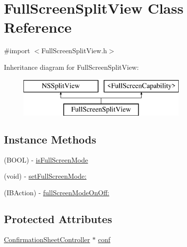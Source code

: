 \hypertarget{interface_full_screen_split_view}{\section{Full\-Screen\-Split\-View Class Reference}
\label{interface_full_screen_split_view}
}


{\ttfamily \#import $<$Full\-Screen\-Split\-View.\-h$>$}

Inheritance diagram for Full\-Screen\-Split\-View\-:\begin{figure}[H]
\begin{center}
\leavevmode
\includegraphics[height=2.000000cm]{interface_full_screen_split_view}
\end{center}
\end{figure}
\subsection*{Instance Methods}
\begin{DoxyCompactItemize}
\item 
(B\-O\-O\-L) -\/ \hyperlink{interface_full_screen_split_view_a0765a5b295dd3e378e898e0e104ebc86}{is\-Full\-Screen\-Mode}
\item 
(void) -\/ \hyperlink{interface_full_screen_split_view_af4ae7f6ecd780937432be3efe4198766}{set\-Full\-Screen\-Mode\-:}
\item 
(I\-B\-Action) -\/ \hyperlink{interface_full_screen_split_view_a039f89a557a3955a07c700c8a7a1f781}{full\-Screen\-Mode\-On\-Off\-:}
\end{DoxyCompactItemize}
\subsection*{Protected Attributes}
\begin{DoxyCompactItemize}
\item 
\hyperlink{interface_confirmation_sheet_controller}{Confirmation\-Sheet\-Controller} $\ast$ \hyperlink{interface_full_screen_split_view_a9056de75af0a646581cf04b547299d2c}{conf}
\end{DoxyCompactItemize}


